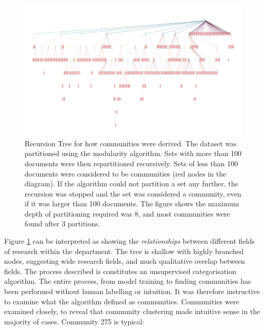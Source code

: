 \begin{center}
\begin{figure}[H]
  \centering
    \includegraphics[width=\textwidth]{Analysis/comms.png}
    \caption{Recursion Tree for how communities were derived. The dataset was partitioned using the modularity algorithm. Sets with more than 100 documents were then repartitioned recursively. Sets of less than 100 documents were considered to be communities (red nodes in the diagram). If the algorithm could not partition a set any further, the recursion was stopped and the set was considered a community, even if it was larger than 100 documents.  The figure shows the maximum depth of partitioning required was 8, and most communities were found after 3 partitions.}
    \label{fig:COMMTREE}

\end{figure} 
\end{center}
Figure \ref{fig:COMMTREE} can be interpreted as showing the \emph{relationships} between different fields of research within the department. The tree is shallow with highly branched nodes, suggesting wide research fields, and much qualitative overlap between fields.
The process described is constitutes an unsupervised categorisation algorithm. The entire process, from model training to finding communities has been performed without human labelling or intuition. It was therefore instructive to examine what the algorithm defined as communities.
Communities were examined closely, to reveal that community clustering made intuitive sense in the majority of cases. Community 275 is typical:
